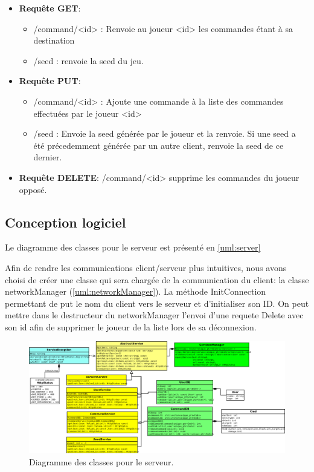     \begin{itemize}
        \item \textbf{Requ\^ete GET}:
            \begin{itemize}
                \item /command/<id> : Renvoie au joueur <id> les commandes étant à sa destination
                \item /seed : renvoie la seed du jeu.
            \end{itemize}
        \item \textbf{Requ\^ete PUT}:
            \begin{itemize}
                \item /command/<id> : Ajoute une commande à la liste des commandes effectuées par le joueur <id>
                \item /seed : Envoie la seed générée par le joueur et la renvoie. Si une seed a été précedemment générée par un autre client, renvoie la seed de ce dernier.
            \end{itemize}
        \item \textbf{Requ\^ete DELETE}: /command/<id> supprime les commandes du joueur opposé.
    \end{itemize}


\subsection{Conception logiciel}
Le diagramme des classes pour le serveur est présenté en \autoref{uml:server}

Afin de rendre les communications client/serveur plus intuitives, nous avons choisi de créer une classe qui sera chargée de la communication du client: la classe networkManager (\autoref{uml:networkManager}). La méthode InitConnection permettant de put le nom du client vers le serveur et d'initialiser son ID. On peut mettre dans le destructeur du networkManager l'envoi d'une requete Delete avec son id afin de supprimer le joueur de la liste lors de sa déconnexion.

\begin{landscape}
\begin{figure}[p]
\centering
\includegraphics[width=0.9\paperheight]{images/server.png}
\caption{\label{uml:server}Diagramme des classes pour le serveur.} 
\end{figure}
\end{landscape}

